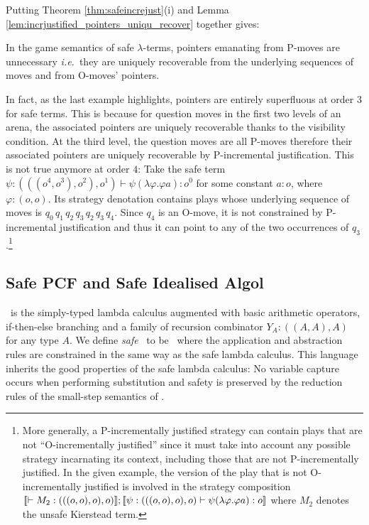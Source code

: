 Putting Theorem \ref{thm:safeincrejust}(i) and Lemma
\ref{lem:incrjustified_pointers_uniqu_recover} together gives:
\begin{proposition}
  \label{prop:safe_ptr_recoverable} In the game semantics of safe
  $\lambda$-terms, pointers emanating from P-moves are unnecessary
  {\it i.e.}~they are uniquely recoverable from the underlying sequences of
  moves and from O-moves' pointers.
\end{proposition}


In fact, as the last example highlights, pointers are entirely superfluous at
order $3$ for safe terms. This is because for
question moves in the first two levels of an arena,
the associated pointers are uniquely recoverable thanks to
the visibility condition. At the third level, the question moves are all P-moves therefore their associated pointers are uniquely recoverable by
P-incremental justification. This is not true anymore at order $4$:
Take the safe term $\psi:(((o^4,o^3),o^2),o^1) \vdash \psi (\lambda \varphi . \varphi a) : o^0$
for some constant $a:o$, where $\varphi:(o,o)$. Its strategy denotation contains plays whose underlying sequence of moves is $q_0 \, q_1 \, q_2 \, q_3 \, q_2 \, q_3 \, q_4$.
Since $q_4$ is an O-move, it is not constrained by
P-incremental justification and thus it can point to any of the two occurrences of $q_3$.\footnote{More generally,
a P-incrementally justified strategy can contain plays that are not ``O-incrementally justified'' since it must take into account any possible strategy incarnating its context, including those that are not P-incrementally justified.
In the given example, the version of the play that is not O-incrementally justified is involved in the strategy composition
${[\![  \vdash M_2 : (((o,o),o),o) ]\!]} ; {[\![  \psi:(((o,o),o),o) \vdash \psi (\lambda \varphi . \varphi a):o ]\!]}$ where $M_2$ denotes the unsafe Kierstead term.}

\subsection*{Safe PCF and Safe Idealised Algol}

\pcf\ is the simply-typed lambda calculus augmented with basic
arithmetic operators, if-then-else branching and a family of recursion
combinator $Y_A : ((A,A),A)$ for any type $A$.  We define \emph{safe}
\pcf\ to be \pcf\ where the application and abstraction rules are
constrained in the same way as the safe lambda calculus.  This
language inherits the good properties of the safe lambda calculus: No
variable capture occurs when performing substitution and safety is
preserved by the reduction rules of the small-step semantics of
\pcf.

